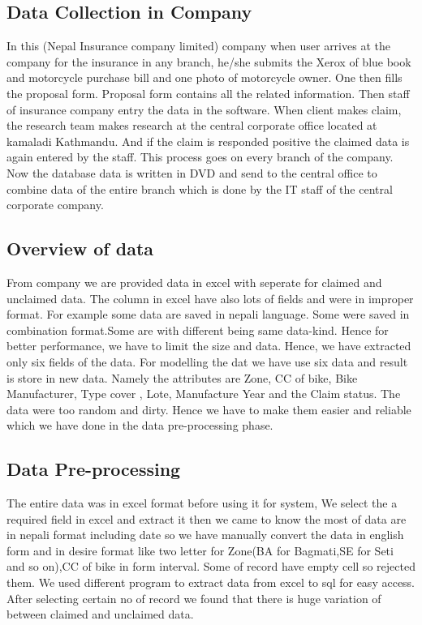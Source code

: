 \subsection{Data Collection in Company}
In this (Nepal Insurance company limited) company when user arrives at the company for the insurance in any branch, he/she submits the Xerox of blue book and motorcycle purchase bill and one photo of motorcycle owner. One then fills the proposal form. Proposal form contains all the related information. Then staff of insurance company entry the data in the software. When client makes claim, the research team makes research at the central corporate office located at kamaladi Kathmandu. And if the claim is responded positive the claimed data is again entered by the staff. This process goes on every branch of the company. Now the database data is written in DVD and send to the central office to combine data of the entire branch which is done by the IT staff of the central corporate company.

\subsection{Overview of data}
From company we are provided data in excel with seperate  for claimed and unclaimed data. The column in excel  have also lots of fields and were in improper format. For example some data are saved in nepali language. Some were saved in combination format.Some are with different being same data-kind.  Hence for better performance, we have to limit the size and data. Hence, we have extracted only six fields of the data. For modelling the dat we have use six data and result is store in  new data. Namely the attributes are Zone, CC of bike, Bike Manufacturer, Type cover , Lote, Manufacture Year and the Claim status. The data were too random and dirty. Hence we have to make them easier and reliable which we have done in the data pre-processing phase.
\subsection{Data Pre-processing}
The entire data was in excel format before using it for system, We select the a required field in excel and extract it then we came to know the most of data are in  nepali format including date so we have manually convert the data in english form and in desire format like two letter for Zone(BA for Bagmati,SE for Seti and so on),CC of bike in form interval. Some of record have empty cell so rejected them. We used different program to extract data from excel to \acs{sql} for easy access. After selecting certain no of record we found that there is huge variation of between claimed and unclaimed data.
